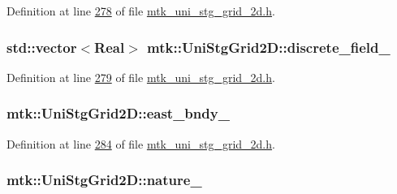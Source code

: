 Definition at line \hyperlink{mtk__uni__stg__grid__2d_8h_source_l00278}{278} of file \hyperlink{mtk__uni__stg__grid__2d_8h_source}{mtk\+\_\+uni\+\_\+stg\+\_\+grid\+\_\+2d.\+h}.

\hypertarget{classmtk_1_1UniStgGrid2D_ad7474b2669ee988b84aed20b7f5dc7be}{
\subsubsection[{discrete\+\_\+field\+\_\+}]{\setlength{\rightskip}{0pt plus 5cm}std\+::vector$<${\bf Real}$>$ mtk\+::\+Uni\+Stg\+Grid2\+D\+::discrete\+\_\+field\+\_\+\hspace{0.3cm}{\ttfamily [private]}}}\label{classmtk_1_1UniStgGrid2D_ad7474b2669ee988b84aed20b7f5dc7be}


Definition at line \hyperlink{mtk__uni__stg__grid__2d_8h_source_l00279}{279} of file \hyperlink{mtk__uni__stg__grid__2d_8h_source}{mtk\+\_\+uni\+\_\+stg\+\_\+grid\+\_\+2d.\+h}.

\hypertarget{classmtk_1_1UniStgGrid2D_ae24f3d5bf5ed3a6d066cdf48aa1fb307}{
\subsubsection[{east\+\_\+bndy\+\_\+}]{ mtk\+::\+Uni\+Stg\+Grid2\+D\+::east\+\_\+bndy\+\_\+\hspace{0.3cm}{\ttfamily [private]}}}\label{classmtk_1_1UniStgGrid2D_ae24f3d5bf5ed3a6d066cdf48aa1fb307}


Definition at line \hyperlink{mtk__uni__stg__grid__2d_8h_source_l00284}{284} of file \hyperlink{mtk__uni__stg__grid__2d_8h_source}{mtk\+\_\+uni\+\_\+stg\+\_\+grid\+\_\+2d.\+h}.

\hypertarget{classmtk_1_1UniStgGrid2D_ac8b66740d328803f7fbabd1c42c775b2}{
\subsubsection[{nature\+\_\+}]{ mtk\+::\+Uni\+Stg\+Grid2\+D\+::nature\+\_\+\hspace{0.3cm}{\ttfamily [private]}}}\label{classmtk_1_1UniStgGrid2D_ac8b66740d328803f7fbabd1c42c775b2}


